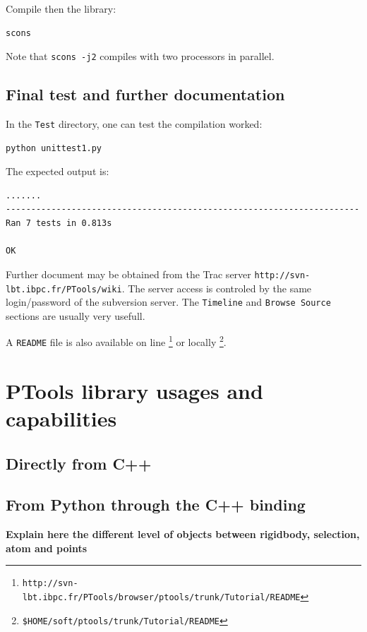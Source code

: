 \documentclass[12pt,a4paper]{article}
\begin{document}
Compile then the library:
\begin{verbatim}
scons
\end{verbatim}

Note that {\tt scons -j2} compiles with two processors in parallel.

\subsection{Final test and further documentation}

In the {\tt Test} directory, one can test the compilation worked:
\begin{verbatim}
python unittest1.py
\end{verbatim}

The expected output is:
\begin{verbatim}
....... 
---------------------------------------------------------------------- 
Ran 7 tests in 0.813s 

OK 
\end{verbatim}

Further document may be obtained from the Trac server {\tt http://svn-lbt.ibpc.fr/PTools/wiki}. 
The server access is controled by the same login/password of the subversion server. The {\tt Timeline}
and {\tt Browse Source} sections are usually very usefull.

A {\tt README} file is also available on line 
\footnote{\tt http://svn-lbt.ibpc.fr/PTools/browser/ptools/trunk/Tutorial/README} 
or locally \footnote{\tt \$HOME/soft/ptools/trunk/Tutorial/README}.


\section{PTools library usages and capabilities}

\subsection{Directly from C++}

\subsection{From Python through the C++ binding}

\vspace*{2cm}
{\bf Explain here the different level of objects between rigidbody, selection, atom and points}
\vspace*{2cm}
\end{document}
